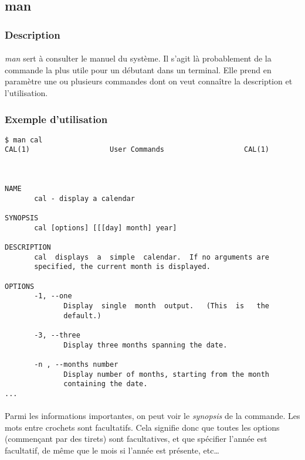 \subsection{man}

\subsubsection*{Description}

\paragraph{} \emph{man} sert à consulter le manuel du système. Il s'agit là
probablement de la commande la plus utile pour un débutant dans un terminal.
Elle prend en paramètre une ou plusieurs commandes dont on veut connaître la
description et l'utilisation.

\subsubsection*{Exemple d'utilisation}

\begin{lstlisting}
$ man cal
CAL(1)                   User Commands                   CAL(1)



NAME
       cal - display a calendar

SYNOPSIS
       cal [options] [[[day] month] year]

DESCRIPTION
       cal  displays  a  simple  calendar.  If no arguments are
       specified, the current month is displayed.

OPTIONS
       -1, --one
              Display  single  month  output.   (This  is   the
              default.)

       -3, --three
              Display three months spanning the date.

       -n , --months number
              Display number of months, starting from the month
              containing the date.
...
\end{lstlisting}

\paragraph{} Parmi les informations importantes, on peut voir le
\emph{synopsis} de la commande. Les mots entre crochets sont facultatifs. Cela
signifie donc que toutes les options (commençant par des tirets) sont
facultatives, et que spécifier l'année est facultatif, de même que le mois si
l'année est présente, etc\ldots

